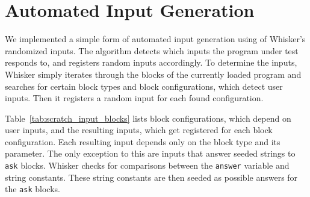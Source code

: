 \section{Automated Input Generation}
\label{sec:automated_input_generation}

We implemented a simple form of automated input generation using of Whisker's randomized inputs.
The algorithm detects which inputs the program under test responds to,
and registers random inputs accordingly.
To determine the inputs, Whisker simply iterates through the blocks of the currently loaded program
and searches for certain block types and block configurations, which detect user inputs.
Then it registers a random input for each found configuration.
\parspace

Table~\ref{tab:scratch_input_blocks} lists block configurations, which depend on user inputs,
and the resulting inputs, which get registered for each block configuration.
Each resulting input depends only on the block type and its parameter.
The only exception to this are inputs that answer seeded strings to \texttt{ask} blocks.
Whisker checks for comparisons between the \texttt{answer} variable and string constants.
These string constants are then seeded as possible answers for the \texttt{ask} blocks.
\parspace

\newcommand{\tablebox}[1]{
    \begin{tikzpicture}
         \node[draw, text width=8.5cm, minimum height=0.6cm, rounded corners] {\footnotesize #1};
    \end{tikzpicture}
}

